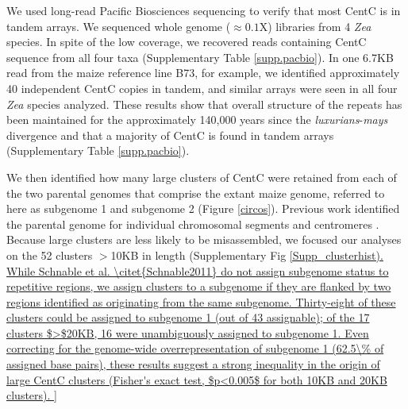 We used long-read Pacific Biosciences sequencing to verify that most CentC is in tandem arrays. We sequenced whole genome ($\approx 0.1$X) libraries from 4 \emph{Zea} species.  In spite of the low coverage, we recovered reads containing CentC sequence from all four taxa (Supplementary Table \ref{supp.pacbio}).  In one 6.7KB read from the maize reference line B73, for example, we identified approximately 40 independent CentC copies in tandem, and similar arrays were seen in all four \emph{Zea} species analyzed.  These results show that overall structure of the repeats has been maintained for the approximately 140,000 years since the \emph{luxurians}-\emph{mays} divergence \citep{Hanson1996,  Ross-Ibarra2009} and that a majority of CentC is found in tandem arrays (Supplementary Table \ref{supp.pacbio}).

We then identified how many large clusters of CentC were retained from each of the two parental genomes that comprise the extant maize genome, referred to here as subgenome 1 and subgenome 2 (Figure \ref{circos}).  Previous work identified the parental genome for individual chromosomal segments \citep{Schnable2011} and centromeres \citep{Wang2012}.  Because large clusters are less likely to be misassembled, we focused our analyses on the 52 clusters $>$10KB in length (Supplementary Fig \ref{Supp_clusterhist).  While Schnable et al. \citet{Schnable2011} do not assign subgenome status to repetitive regions, we assign clusters to a subgenome if they are flanked by two regions identified as originating from the same  subgenome.  Thirty-eight of these clusters could be assigned to subgenome 1 (out of 43 assignable); of the 17 clusters $>$20KB, 16 were unambiguously assigned to subgenome 1.  Even correcting for the genome-wide overrepresentation of subgenome 1 (62.5\% of assigned base pairs), these results suggest a strong inequality in the origin of large CentC clusters (Fisher's exact test, $p<0.005$ for both 10KB and 20KB clusters).

}
